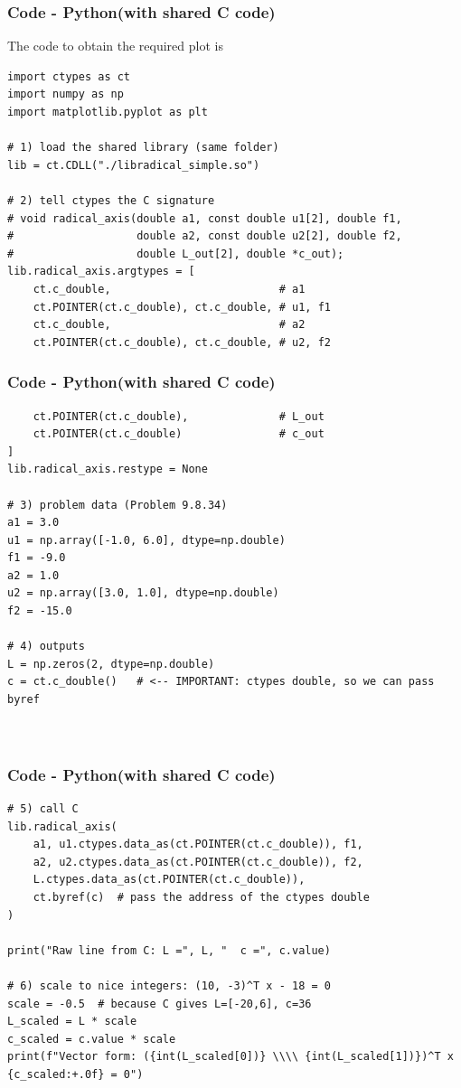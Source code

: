 \documentclass{beamer}
\theoremstyle{remark}
\numberwithin{equation}{section}
\begin{document}
\begin{frame}[fragile]
    \frametitle{Code - Python(with shared C code)}
    The code to obtain the required plot is
    \begin{lstlisting}
import ctypes as ct
import numpy as np
import matplotlib.pyplot as plt

# 1) load the shared library (same folder)
lib = ct.CDLL("./libradical_simple.so")

# 2) tell ctypes the C signature
# void radical_axis(double a1, const double u1[2], double f1,
#                   double a2, const double u2[2], double f2,
#                   double L_out[2], double *c_out);
lib.radical_axis.argtypes = [
    ct.c_double,                          # a1
    ct.POINTER(ct.c_double), ct.c_double, # u1, f1
    ct.c_double,                          # a2
    ct.POINTER(ct.c_double), ct.c_double, # u2, f2

\end{lstlisting}
\end{frame}
\begin{frame}[fragile]
\frametitle{Code - Python(with shared C code)}
\begin{lstlisting}
    ct.POINTER(ct.c_double),              # L_out
    ct.POINTER(ct.c_double)               # c_out
]
lib.radical_axis.restype = None

# 3) problem data (Problem 9.8.34)
a1 = 3.0
u1 = np.array([-1.0, 6.0], dtype=np.double)
f1 = -9.0
a2 = 1.0
u2 = np.array([3.0, 1.0], dtype=np.double)
f2 = -15.0

# 4) outputs
L = np.zeros(2, dtype=np.double)
c = ct.c_double()   # <-- IMPORTANT: ctypes double, so we can pass byref



\end{lstlisting}
\end{frame}

\begin{frame}[fragile]
\frametitle{Code - Python(with shared C code)}
\begin{lstlisting}
# 5) call C
lib.radical_axis(
    a1, u1.ctypes.data_as(ct.POINTER(ct.c_double)), f1,
    a2, u2.ctypes.data_as(ct.POINTER(ct.c_double)), f2,
    L.ctypes.data_as(ct.POINTER(ct.c_double)),
    ct.byref(c)  # pass the address of the ctypes double
)

print("Raw line from C: L =", L, "  c =", c.value)

# 6) scale to nice integers: (10, -3)^T x - 18 = 0
scale = -0.5  # because C gives L=[-20,6], c=36
L_scaled = L * scale
c_scaled = c.value * scale
print(f"Vector form: ({int(L_scaled[0])} \\\\ {int(L_scaled[1])})^T x {c_scaled:+.0f} = 0")



\end{lstlisting}
\end{frame}
\end{document}
